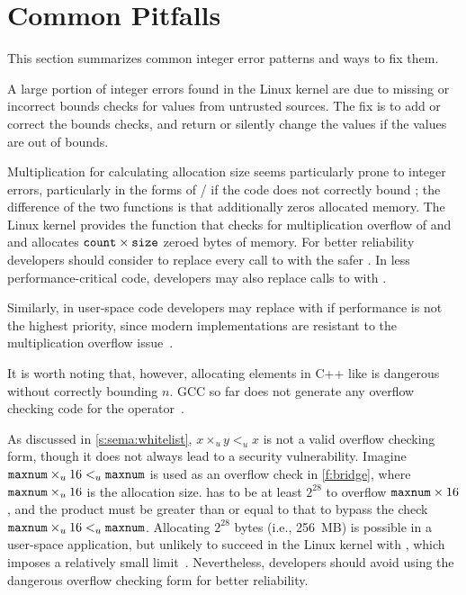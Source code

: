 \section{Common Pitfalls}
\label{s:common}

This section summarizes common integer error patterns and ways
to fix them.

A large portion of integer errors found in the Linux kernel are due
to missing or incorrect bounds checks for values from untrusted sources.
The fix is to add or correct the bounds checks, and return 
or silently change the values if the values are out of bounds.

Multiplication for calculating allocation size seems particularly
prone to integer errors, particularly in the forms of
/ if
the code does not correctly bound ;
the difference of the two functions is that  additionally
zeros allocated memory.
The Linux kernel provides the function
 that checks for multiplication overflow
of  and  and allocates
$\texttt{count}\times\texttt{size}$ zeroed bytes of memory.
For better reliability developers should consider to replace every
call to  with the safer .
In less performance-critical code, developers may also replace calls
to  with .

Similarly, in user-space code developers may replace  with 
if performance is not the highest priority,
since modern  implementations are resistant
to the multiplication overflow issue~\cite{rus-cert:calloc}.

It is worth noting that, however, allocating elements in C++ like  is dangerous without correctly bounding $n$.  GCC so far
does not generate any overflow checking code for the 
operator~\cite{gcc-new}.

As discussed in \autoref{s:sema:whitelist},
$x \times_u y <_u x$ is not a valid overflow checking form,
though it does not always lead to a security vulnerability.
Imagine $\texttt{maxnum} \times_u 16 <_u \texttt{maxnum}$ is used as an
overflow check in \autoref{f:bridge}, where $\texttt{maxnum} \times_u
16$ is the allocation size.
 has to be at least $2^{28}$ to
overflow $\texttt{maxnum} \times 16$, and the product must be greater
than or equal to that to bypass the check $\texttt{maxnum} \times_u 16
<_u \texttt{maxnum}$.  Allocating $2^{28}$ bytes (i.e., 256~MB) is
possible in a user-space application, but unlikely to succeed in
the Linux kernel with , which imposes a relatively small
limit~\cite[\chapterautorefname~8]{ldd3}.
Nevertheless, developers should avoid using the dangerous overflow
checking form for better reliability.

